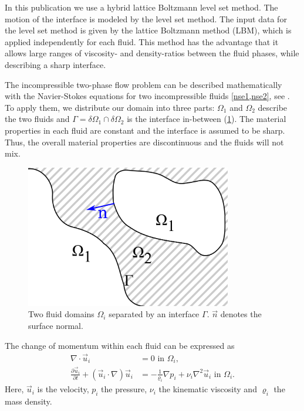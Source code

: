 \documentclass[final,leqno,onefignum,onetabnum]{siamltexmm}
\begin{document}
In this publication we use a hybrid lattice Boltzmann level set method. The motion of the interface is modeled by the level set method. The input data for the level set method is given by the lattice Boltzmann method (LBM), which is applied independently for each fluid. This method has the advantage that it allows large ranges of viscosity- and density-ratios between the fluid phases, while describing a sharp interface.

The incompressible two-phase flow problem can be described mathematically with the Navier-Stokes equations for two incompressible fluids \cref{nse1,nse2}, see \cite{ferziger}. To apply them, we distribute our domain into three parts: $\Omega_1$ and $\Omega_2$ describe the two fluids and $\Gamma = \delta\Omega_1 \cap \delta\Omega_2$ is the interface in-between (\cref{intro_phases}). The material properties in each fluid are constant and the interface is assumed to be sharp. Thus, the overall material properties are discontinuous and the fluids will not mix.
\begin{figure}[h!]
	\flushright
	\hfill\includegraphics[width=9cm,natwidth=1690,natheight=1174]{skizze.png}\hspace*{\fill}
	\caption{Two fluid domains $\Omega_i$ separated by an interface $\Gamma$. $\vec n$ denotes the surface normal.}
	\label{intro_phases}
\end{figure}

\vspace{1cm}
The change of momentum within each fluid can be expressed as
\begin{align}
  \nabla \cdot  \vec u_i &= 0 \text{  in } \Omega_i \text{,}
	\label{nse1} \\
	\frac{\partial \vec u_i}{\partial t} + \left(\vec  u_i\cdot \nabla \right) \vec u_i
  &=
	-\frac{1}{\varrho_i}\nabla p_i + \nu_i \nabla^2 \vec u_i \text{  in } \Omega_i \text{.}
	\label{nse2}
\end{align}
Here, $\vec u_i$ is the velocity, $p_i$ the pressure, $\nu_i$ the kinematic viscosity and $\varrho_i$ the mass density.
\end{document}
